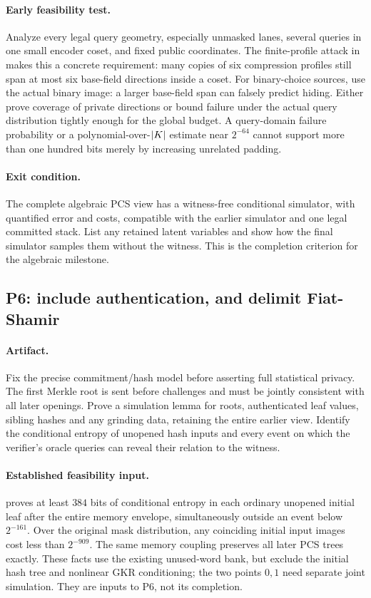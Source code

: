 \paragraph{Early feasibility test.} Analyze every legal query geometry, especially unmasked lanes, several queries in one small encoder coset, and fixed public coordinates. The finite-profile attack in  makes this a concrete requirement: many copies of six compression profiles still span at most six base-field directions inside a coset. For binary-choice sources, use the actual binary image: a larger base-field span can falsely predict hiding. Either prove coverage of private directions or bound failure under the actual query distribution tightly enough for the global budget. A query-domain failure probability or a polynomial-over-$|K|$ estimate near $2^{-64}$ cannot support more than one hundred bits merely by increasing unrelated padding.

\paragraph{Exit condition.} The complete algebraic PCS view has a witness-free conditional simulator, with quantified error and costs, compatible with the earlier simulator and one legal committed stack. List any retained latent variables and show how the final simulator samples them without the witness. This is the completion criterion for the algebraic milestone.

\subsection{P6: include authentication, and delimit Fiat-Shamir}

\paragraph{Artifact.} Fix the precise commitment/hash model before asserting full statistical privacy. The first Merkle root is sent before challenges and must be jointly consistent with all later openings. Prove a simulation lemma for roots, authenticated leaf values, sibling hashes and any grinding data, retaining the entire earlier view. Identify the conditional entropy of unopened hash inputs and every event on which the verifier's oracle queries can reveal their relation to the witness.

\paragraph{Established feasibility input.}  proves at least $384$ bits of conditional entropy in each ordinary unopened initial leaf after the entire memory envelope, simultaneously outside an event below $2^{-161}$. Over the original mask distribution, any coinciding initial input images cost less than $2^{-909}$. The same memory coupling preserves all later PCS trees exactly. These facts use the existing unused-word bank, but exclude the initial hash tree and nonlinear GKR conditioning; the two points $0,1$ need separate joint simulation. They are inputs to P6, not its completion.

